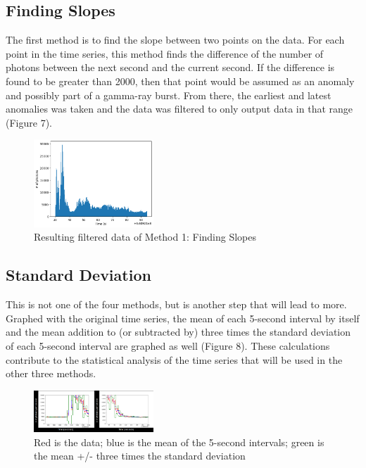 \documentclass[final,5p,times,twocolumn,authoryear]{elsarticle}
\begin{document}
\subsection{Finding Slopes}
The first method is to find the slope between two points on the data. For each point in the time series, this method finds the difference of the number of photons between the next second and the current second. If the difference is found to be greater than 2000, then that point would be assumed as an anomaly and possibly part of a gamma-ray burst. From there, the earliest and latest anomalies was taken and the data was filtered to only output data in that range (Figure 7).
\begin{figure}[H]
	\centering 
	\includegraphics[width=0.4\textwidth]{images/FindingSlopes.png}	
	\caption{Resulting filtered data of Method 1: Finding Slopes} 
	\label{fig_mom0}%
\end{figure}
\subsection{Standard Deviation}
This is not one of the four methods, but is another step that will lead to more. Graphed with the original time series, the mean of each 5-second interval by itself and the mean addition to (or subtracted by) three times the standard deviation of each 5-second interval are graphed as well (Figure 8). These calculations contribute to the statistical analysis of the time series that will be used in the other three methods.
\begin{figure}[H]
	\centering 
	\includegraphics[width=0.4\textwidth]{images/STDs.png}	
	\caption{Red is the data; blue is the mean of the 5-second intervals; green is the mean +/- three times the standard deviation} 
	\label{fig_mom0}%
\end{figure}
\end{document}
